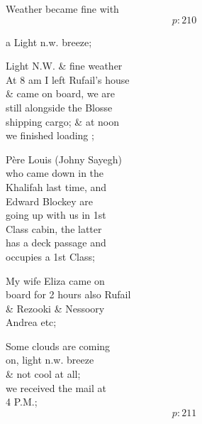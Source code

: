 \documentclass{report}
\begin{document}
	\par{
 	Weather became fine with\ \\
  \[p: 210 \]

	}


	\par{
 	a Light n.w. breeze;\ \\
	}

	\par{
 	Light N.W. \& fine weather\ \\At 8 am I left Rufail's house\ \\\& came on board, we are\ \\still alongside the Blosse\ \\shipping cargo; \& at noon\ \\we finished loading ;\ \\
	}

	\par{
 	Père Louis (Johny Sayegh)\ \\who came down in the\ \\Khalifah last time, and\ \\Edward Blockey are\ \\going up with us in 1st\ \\Class cabin, the latter\ \\has a deck passage and\ \\occupies a 1st Class;\ \\
	}

	\par{
 	My wife Eliza came on\ \\board for 2 hours also Rufail\ \\\& Rezooki \& Nessoory\ \\Andrea etc;\ \\
	}

	\par{
 	Some clouds are coming\ \\on, light n.w. breeze\ \\\& not cool at all;\ \\we received the mail at\ \\4 P.M.;\ \\
  \[p: 211 \]

	}



\end{document}
